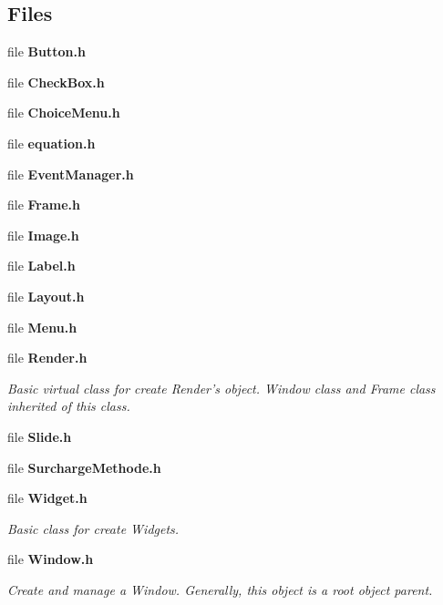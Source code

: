 \subsection*{Files}
\begin{DoxyCompactItemize}
\item 
file {\bfseries Button.\-h}
\item 
file {\bfseries Check\-Box.\-h}
\item 
file {\bfseries Choice\-Menu.\-h}
\item 
file {\bfseries equation.\-h}
\item 
file {\bfseries Event\-Manager.\-h}
\item 
file {\bfseries Frame.\-h}
\item 
file {\bfseries Image.\-h}
\item 
file {\bfseries Label.\-h}
\item 
file {\bfseries Layout.\-h}
\item 
file {\bfseries Menu.\-h}
\item 
file {\bf Render.\-h}
\begin{DoxyCompactList}\small\item\em Basic virtual class for create Render's object. Window class and Frame class inherited of this class. \end{DoxyCompactList}\item 
file {\bfseries Slide.\-h}
\item 
file {\bfseries Surcharge\-Methode.\-h}
\item 
file {\bf Widget.\-h}
\begin{DoxyCompactList}\small\item\em Basic class for create Widgets. \end{DoxyCompactList}\item 
file {\bf Window.\-h}
\begin{DoxyCompactList}\small\item\em Create and manage a Window. Generally, this object is a root object parent. \end{DoxyCompactList}\end{DoxyCompactItemize}
